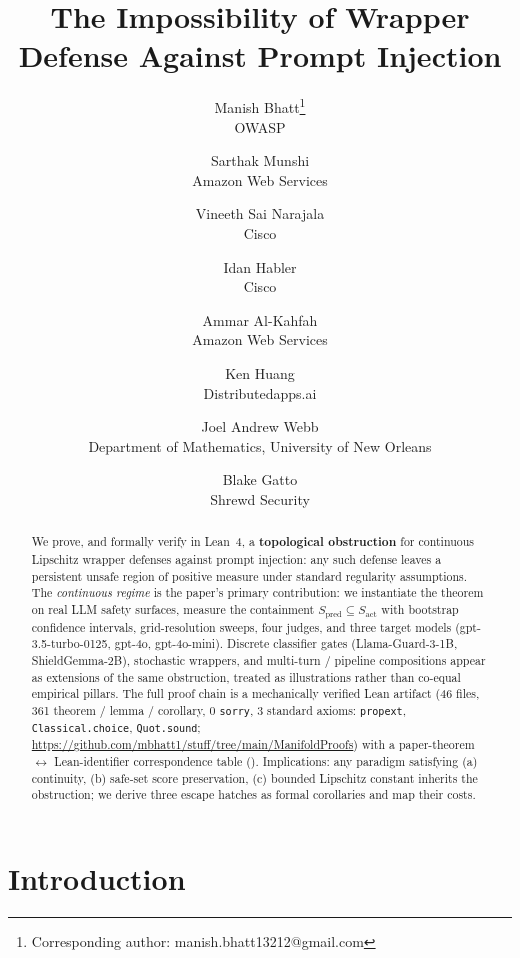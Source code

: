 \documentclass[11pt]{article}
\title{The Impossibility of Wrapper Defense Against Prompt Injection}
\author{
    {\rm Manish Bhatt\thanks{Corresponding author: manish.bhatt13212@gmail.com}}\hspace{0.5em}\footnotemark[2]\\
    OWASP
    \and
    {\rm Sarthak Munshi}\footnotemark[2]\\
    Amazon Web Services
  \and
  {\rm Vineeth Sai Narajala}\footnotemark[2]\\
  Cisco
  \and
  {\rm Idan Habler}\footnotemark[2]\\
  Cisco
  \and
  {\rm Ammar Al-Kahfah}\footnotemark[2]\\
  Amazon Web Services
  \and
  {\rm Ken Huang}\\
  Distributedapps.ai
  \and
  {\rm Joel Andrew Webb}\\
  Department of Mathematics, University of New Orleans
  \and
  {\rm Blake Gatto}\\
  Shrewd Security
  }
\date{}
\begin{document}
\maketitle
\renewcommand{\thefootnote}{\fnsymbol{footnote}}
\begin{abstract}
We prove, and formally verify in Lean~4, a \textbf{topological
obstruction} for continuous Lipschitz wrapper defenses against prompt
injection: any such defense leaves a persistent unsafe region of
positive measure under standard regularity assumptions. The
\emph{continuous regime} is the paper's primary contribution: we
instantiate the theorem on real LLM safety surfaces, measure the
containment $S_{\text{pred}} \subseteq S_{\text{act}}$ with bootstrap
confidence intervals, grid-resolution sweeps, four judges, and three
target models (gpt-3.5-turbo-0125, gpt-4o, gpt-4o-mini). Discrete
classifier gates (Llama-Guard-3-1B, ShieldGemma-2B), stochastic
wrappers, and multi-turn / pipeline compositions appear as extensions
of the same obstruction, treated as illustrations rather than co-equal
empirical pillars. The full proof chain is a mechanically verified
Lean artifact (46 files, 361 theorem / lemma / corollary,
0 \texttt{sorry}, 3 standard axioms: \texttt{propext},
\texttt{Classical.choice}, \texttt{Quot.sound};
\url{https://github.com/mbhatt1/stuff/tree/main/ManifoldProofs}) with a
paper-theorem $\leftrightarrow$ Lean-identifier correspondence table
(). Implications: any paradigm
satisfying (a) continuity, (b) safe-set score preservation, (c)
bounded Lipschitz constant inherits the obstruction; we derive three
escape hatches as formal corollaries and map their costs.
\end{abstract}


\section{Introduction}
\label{sec:intro}
\end{document}

